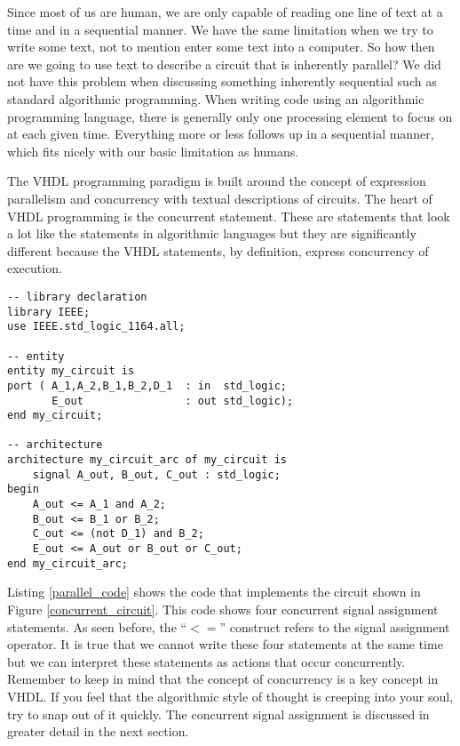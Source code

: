Since most of us are human, we are only capable of reading one line of text at a time and in a sequential manner. We have the same limitation when we try to write some text, not to mention enter some text into a computer. So how then are we going to use text to describe a circuit that is inherently parallel? We did not have this problem when discussing something inherently sequential such as standard algorithmic programming. When writing code using an algorithmic programming language, there is generally only one processing element to focus on at each given time. Everything more or less follows up in a sequential manner, which fits nicely with our basic limitation as humans. 

The VHDL programming paradigm is built around the concept of expression parallelism and concurrency with textual descriptions of circuits. The heart of VHDL programming is the concurrent statement. These are statements that look a lot like the statements in algorithmic languages but they are significantly different because the VHDL statements, by definition, express concurrency of execution.

\begin{lstlisting}[float, label=parallel_code, caption=VHDL code for the circuit of Figure 4.1.]
-- library declaration
library IEEE;
use IEEE.std_logic_1164.all;

-- entity
entity my_circuit is
port ( A_1,A_2,B_1,B_2,D_1	: in  std_logic;
       E_out				: out std_logic);
end my_circuit;

-- architecture
architecture my_circuit_arc of my_circuit is
	signal A_out, B_out, C_out : std_logic;
begin
	A_out <= A_1 and A_2;   
	B_out <= B_1 or B_2; 
	C_out <= (not D_1) and B_2; 
	E_out <= A_out or B_out or C_out;
end my_circuit_arc;
\end{lstlisting}

Listing \ref{parallel_code} shows the code that implements the circuit shown in Figure \ref{concurrent_circuit}. This code shows four concurrent signal assignment statements. As seen before, the ``$<=$'' construct refers to the signal assignment operator. It is true that we cannot write these four statements at the same time but we can interpret these statements as actions that occur concurrently. Remember to keep in mind that the concept of concurrency is a key concept in VHDL. If you feel that the algorithmic style of thought is creeping into your soul, try to snap out of it quickly. The concurrent signal assignment is discussed in greater detail in the next section. 

